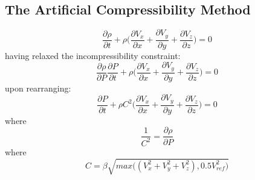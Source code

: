 \documentclass[12pt]{extarticle}
\begin{document}
\subsection*{The Artificial Compressibility Method}
\begin{equation}
\frac{\partial \rho}{\partial t} + \rho \Big(\frac{\partial V_{x}}{\partial x} + \frac{\partial V_{y}}{\partial y} + \frac{\partial V_{z}}{\partial z} \Big) = 0
\end{equation}
having relaxed the incompressibility constraint:
\begin{equation}
\frac{\partial \rho}{\partial P}\frac{\partial P}{\partial t} + \rho \Big(\frac{\partial V_{x}}{\partial x} + \frac{\partial V_{y}}{\partial y} + \frac{\partial V_{z}}{\partial z} \Big) = 0
\end{equation}
upon rearranging:
\begin{equation}
\frac{\partial P}{\partial t} + \rho C^{2} \Big(\frac{\partial V_{x}}{\partial x} + \frac{\partial V_{y}}{\partial y} + \frac{\partial V_{z}}{\partial z} \Big) = 0
\end{equation}
where 
\begin{equation}
\frac{1}{C^{2}} = \frac{\partial \rho}{\partial P}
\end{equation}
where
\begin{equation}
C = \beta \sqrt{max \Big((V_{x}^{2}+V_{y}^{2}+V_{z}^{2}), 0.5V_{ref}^{2} \Big)}
\end{equation}
\end{document}
